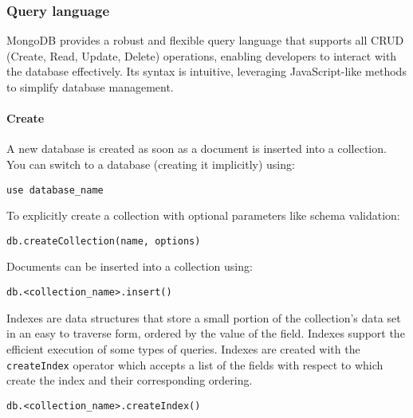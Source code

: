 \subsubsection{Query language}
MongoDB provides a robust and flexible query language that supports all CRUD (Create, Read, Update, Delete) operations, enabling developers to interact with the database effectively. 
Its syntax is intuitive, leveraging JavaScript-like methods to simplify database management.

\paragraph*{Create}
A new database is created as soon as a document is inserted into a collection. 
You can switch to a database (creating it implicitly) using:
\begin{lstlisting}[style=MongoDB]
use database_name
\end{lstlisting}
To explicitly create a collection with optional parameters like schema validation:
\begin{lstlisting}[style=MongoDB]
db.createCollection(name, options)
\end{lstlisting}
Documents can be inserted into a collection using:
\begin{lstlisting}[style=MongoDB]
db.<collection_name>.insert()
\end{lstlisting}
Indexes are data structures that store a small portion of the collection's data set in an easy to traverse form, ordered by the value of the field. 
Indexes support the efficient execution of some types of queries.
Indexes are created with the \texttt{createIndex} operator which accepts a list of the fields with respect to which create the index and their corresponding ordering. 
\begin{lstlisting}[style=MongoDB]
db.<collection_name>.createIndex()
\end{lstlisting}

